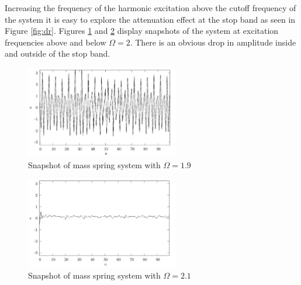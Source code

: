 \documentclass{article}
\begin{document}
Increasing the frequency of the harmonic excitation above the cutoff frequency 
of the system it is easy to explore the attenuation effect at the stop band as 
seen in Figure \ref{fig:dr}. Figures \ref{fig:snap19} and \ref{fig:snap21} 
display snapshots of the system at excitation frequencies above and below 
$\Omega=2$. There is an obvious drop in amplitude inside and outside of the 
stop band.
\begin{figure}[!htbp]
	\centering
	\includegraphics[width=0.6\textwidth]{snap-f19.pdf}
	\caption{Snapshot of mass spring system with $\Omega=1.9$}
	\label{fig:snap19}
\end{figure}
\begin{figure}[!htbp]
	\centering
	\includegraphics[width=0.6\textwidth]{snap-f21.pdf}
	\caption{Snapshot of mass spring system with $\Omega=2.1$}
	\label{fig:snap21}
\end{figure}
\end{document}
